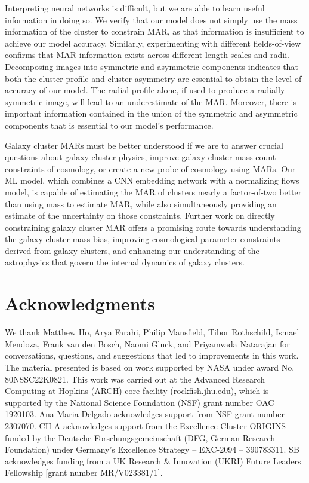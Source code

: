 Interpreting neural networks is difficult, but we are able to learn useful information in doing so. We verify that our model does not simply use the mass information of the cluster to constrain MAR, as that information is insufficient to achieve our model accuracy. Similarly, experimenting with different fields-of-view confirms that MAR information exists across different length scales and radii. Decomposing images into symmetric and asymmetric components indicates that both the cluster profile and cluster asymmetry are essential to obtain the level of accuracy of our model. The radial profile alone, if used to produce a radially symmetric image, will lead to an underestimate of the MAR. Moreover, there is important information contained in the union of the symmetric and asymmetric components that is essential to our model's performance.

Galaxy cluster MARs must be better understood if we are to answer crucial questions about galaxy cluster physics, improve galaxy cluster mass count constraints of cosmology, or create a new probe of cosmology using MARs. Our ML model, which combines a CNN embedding network with a normalizing flows model, is capable of estimating the MAR of clusters nearly a factor-of-two better than using mass to estimate MAR, while also simultaneously providing an estimate of the uncertainty on those constraints. Further work on directly constraining galaxy cluster MAR offers a promising route towards understanding the galaxy cluster mass bias, improving cosmological parameter constraints derived from galaxy clusters, and enhancing our understanding of the astrophysics that govern the internal dynamics of galaxy clusters.



\section*{Acknowledgments}
We thank Matthew Ho, Arya Farahi, Philip Mansfield, Tibor Rothschild, Ismael Mendoza, Frank van den Bosch, Naomi Gluck, and Priyamvada Natarajan for conversations, questions, and suggestions that led to improvements in this work. 
The material presented is based on work supported by NASA under award No. 80NSSC22K0821.  This work was carried out at the Advanced Research Computing at Hopkins (ARCH) core facility  (rockfish.jhu.edu), which is supported by the National Science Foundation (NSF) grant number OAC 1920103. Ana Maria Delgado acknowledges support from NSF grant number 2307070. CH-A acknowledges support from the Excellence Cluster ORIGINS funded by
the Deutsche Forschungsgemeinschaft (DFG, German Research Foundation)
under Germany's Excellence Strategy -- EXC-2094 -- 390783311. SB acknowledges funding from a UK Research \& Innovation (UKRI) Future Leaders Fellowship [grant number MR/V023381/1]. 
